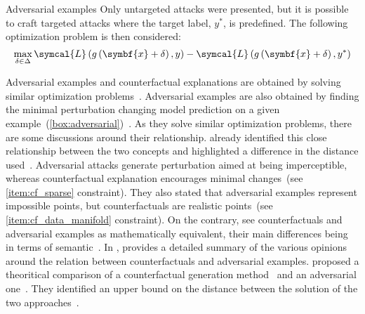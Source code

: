 \documentclass[../main.tex]{subfiles}
\begin{document}
\begin{mybox}[label={box:adversarial}]{Adversarial examples}
	  Only untargeted attacks were presented, but it is possible to craft targeted attacks where the target label, \(y^{\ast}\), is predefined.
	  The following optimization problem is then considered:
	  \[\max_{\delta \in \Delta} \symcal{L}\left(g\left(\symbf{x}+\delta\right), y \right) - \symcal{L}\left(g\left(\symbf{x}+\delta\right), y^{\ast} \right)\]
	\end{mybox}

	Adversarial examples and counterfactual explanations are obtained by solving similar optimization problems~\cite{Pawelczyk2021ExploringCE,Freiesleben2021}.
	Adversarial examples are also obtained by finding the minimal perturbation changing model prediction on a given example~(\cref{box:adversarial})~\cite{Szegedy2013IntriguingPO}.
	As they solve similar optimization problems, there are some discussions around their relationship.
	\citeauthor{wachter2017counterfactual} already identified this close relationship between the two concepts and highlighted a difference in the distance used~\cite{wachter2017counterfactual}.
	Adversarial attacks generate perturbation aimed at being imperceptible, whereas counterfactual explanation encourages minimal changes~(see \ref{item:cf_sparse} constraint).
	They also stated that adversarial examples represent impossible points, but counterfactuals are realistic points~(see \ref{item:cf_data_manifold} constraint).
	On the contrary, \citeauthor{browne2020} see counterfactuals and adversarial examples as mathematically equivalent, their main differences being in terms of semantic~\cite{browne2020}.
	In \cite[][8]{Freiesleben2021}, \citeauthor{Freiesleben2021} provides a detailed summary of the various opinions around the relation between counterfactuals and adversarial examples.
	\citeauthor{Pawelczyk2021ExploringCE} proposed a theoritical comparison of a counterfactual generation method~\cite{wachter2017counterfactual} and an adversarial one~\cite{Carlini2016TowardsET}.
	They identified an upper bound on the distance between the solution of the two approaches~\cite{Pawelczyk2021ExploringCE}.
\end{document}
